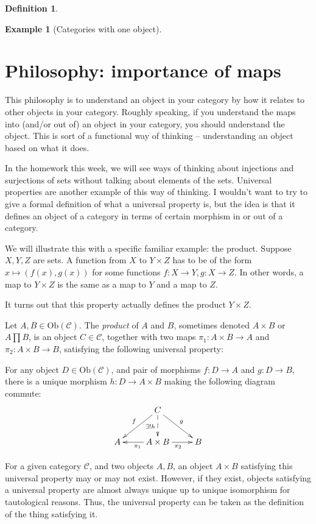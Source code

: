 \documentclass{amsart}
\theoremstyle{definition}
\newtheorem{example}[dummy]{Example}
\newtheorem{definition}[dummy]{Definition}
\begin{document}
\begin{definition}
\begin{example}[Categories with one object]
\section{Philosophy: importance of maps}

  This philosophy is to understand an object in your category by how it relates to other objects in your category.  Roughly speaking, if you understand the maps into (and/or out of) an object in your category, you should understand the object.  This is sort of a functional way of thinking -- understanding an object based on what it does.

In the homework this week, we will see ways of thinking about injections and surjections of sets without talking about elements of the sets.  Universal properties are another example of this way of thinking.  I wouldn't want to try to give a formal definition of what a universal property is, but the idea is that it defines an object of a category in terms of certain morphism in or out of a category.

We will illustrate this with a specific familiar example: the product.  Suppose $X, Y,Z$ are sets.  A function from $X$ to $Y\times Z$ has to be of the form $x\mapsto (f(x), g(x))$ for some functions $f:X\to Y, g:X\to Z$.  In other words, a map to $Y\times Z$ is the same as a map to $Y$ and a map to $Z$.

  It turns out that this property actually defines the product $Y\times Z$.  

  Let $A,B\in \textrm{Ob}(\mathcal{C})$.  The \emph{product} of $A$ and $B$, sometimes denoted $A\times B$ or $A\prod B$, is an object $C\in \mathcal{C}$, together with two maps $\pi_1:A\times B\to A$ and  $\pi_2:A\times B \to B$, satisfying the following universal property:

For any object $D\in\textrm{Ob}(\mathcal{C})$, and pair of morphisms $f:D\to A$ and $g:D\to B$, there is a unique morphism $h:D\to A\times B$ making the following diagram commute:
$$\xymatrix{
& C \ar[dl]_f \ar@{-->}[d]_{\exists !h} \ar[dr]^g \\
A & A\times B \ar[l]^{\pi_1} \ar[r]_{\pi_2} & B}$$
\end{example}


For a given category $\mathcal{C}$, and two objects $A, B$, an object $A\times B$ satisfying this universal property may or may not exist.  However, if they exist, objects satisfying a universal property are almost always unique up to unique isomorphism for tautological reasons.  Thus, the universal property can be taken as the definition of the thing satisfying it.


\end{definition}
\end{document}
